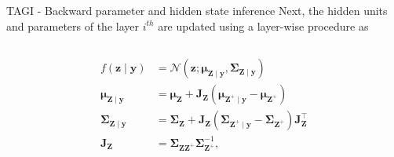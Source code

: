 \documentclass[final]{beamer}
\begin{document}
\begin{frame}[t]
\begin{columns}
\begin{column}[T]{.31\textwidth}
\begin{block}{TAGI - Backward parameter and hidden state inference}
Next, the hidden units and parameters of the layer $i^{th}$ are updated using a layer-wise procedure as
\begin{columns}
\begin{column}{0.5\textwidth}
\begin{equation*}  \label{eq:layerwiseupdate}
\begin{split}
f(\boldsymbol{z} \mid \boldsymbol{y}) &=\mathcal{N}\left(\boldsymbol{z} ; \boldsymbol{\mu}_{\boldsymbol{Z} \mid \boldsymbol{y}}, \boldsymbol{\Sigma}_{\boldsymbol{Z} \mid \boldsymbol{y}}\right) \\
\boldsymbol{\mu}_{\boldsymbol{Z} \mid \boldsymbol{y}} &=\boldsymbol{\mu}_{\boldsymbol{Z}}+\mathbf{J}_{\boldsymbol{Z}}\left(\boldsymbol{\mu}_{\boldsymbol{Z}^{+} \mid \boldsymbol{y}}-\boldsymbol{\mu}_{\boldsymbol{Z}^{+}}\right) \\
\boldsymbol{\Sigma}_{\boldsymbol{Z} \mid \boldsymbol{y}} &=\boldsymbol{\Sigma}_{\boldsymbol{Z}}+\mathbf{J}_{\boldsymbol{Z}}\left(\boldsymbol{\Sigma}_{\boldsymbol{Z}^{+} \mid \boldsymbol{y}}-\boldsymbol{\Sigma}_{\boldsymbol{Z}^{+}}\right) \mathbf{J}_{\boldsymbol{Z}}^{\top} \\
\mathbf{J}_{\boldsymbol{Z}} &=\boldsymbol{\Sigma}_{\boldsymbol{Z Z}^{+}} \boldsymbol{\Sigma}_{\boldsymbol{Z}^{+}}^{-1},
\end{split}
\end{equation*}
\end{column}


\end{columns}
\end{block}
\end{column}
\end{columns}
\end{frame}
\end{document}
